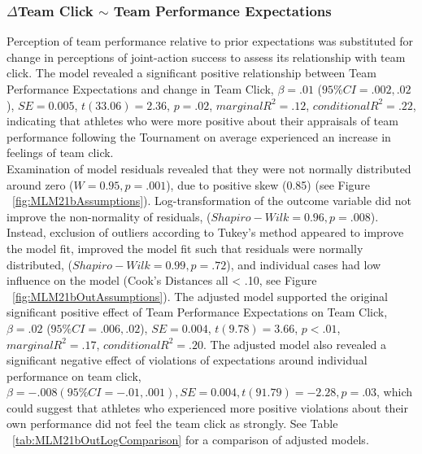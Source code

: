 \documentclass[12pt]{report}
\begin{document}
{\subsubsection{$\Delta$Team Click $\sim$ Team Performance Expectations}

Perception of team performance relative to prior expectations was substituted for change in perceptions of joint-action success to assess its relationship with team click. The model revealed a significant positive relationship between Team Performance Expectations and change in Team Click,  $\beta = .01$ ($95\% CI =  .002, .02$), $SE = 0.005$, $t(33.06) = 2.36$, $p = .02$, $marginal R^2 = .12$, $conditional R^2 = .22$, indicating that athletes who were more positive about their appraisals of team performance following the Tournament on average experienced an increase in feelings of team click. \\

Examination of model residuals revealed that they were not normally distributed around zero ($W = 0.95, p = .001$), due to positive skew (0.85) (see Figure ~\ref{fig:MLM21bAssumptions}).  Log-transformation of the outcome variable did not improve the non-normality of residuals, ($Shapiro-Wilk = 0.96, p = .008$).  Instead, exclusion of outliers according to Tukey's method appeared to improve the model fit,  improved the model fit such that residuals were normally distributed, ($Shapiro-Wilk = 0.99, p = .72$), and individual cases had low influence on the model (Cook's Distances all < .10, see Figure ~\ref{fig:MLM21bOutAssumptions}). The adjusted model supported the original significant positive effect of Team Performance Expectations on Team Click, $\beta = .02$ ($95\% CI =  .006, .02$), $SE = 0.004$, $t(9.78) = 3.66$, $p < .01$, $marginal R^2 = .17$, $conditional R^2 = .20$.  The adjusted model also revealed a significant negative effect of violations of expectations around individual performance on team click, $\beta = -.008 (95\% CI =  -.01, .001), SE = 0.004, t(91.79) = -2.28, p = .03$,  which could suggest that athletes who experienced more positive violations about their own performance did not feel the team click as strongly.  See Table ~\ref{tab:MLM21bOutLogComparison} for a comparison of adjusted models.




}
\end{document}
